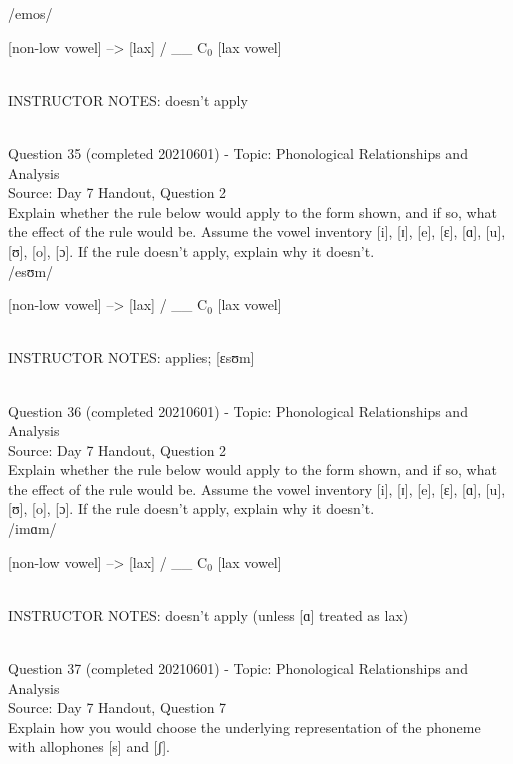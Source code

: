 \documentclass[12pt]{article}
\begin{document}
/emos/

{[non-low vowel]} --> {[lax]} / __ C$_0$ {[lax vowel]}


~\\
INSTRUCTOR NOTES: doesn't apply


~\\

{\large Question 35} (completed 20210601) - Topic: Phonological Relationships and Analysis\\
Source: Day 7 Handout, Question 2\\

Explain whether the rule below would apply to the form shown, and if so, what the effect of the rule would be. Assume the vowel inventory [i], [ɪ], [e], [ɛ], [ɑ], [u], [ʊ], [o], [ɔ]. If the rule doesn't apply, explain why it doesn't.\\

/esʊm/

{[non-low vowel]} --> {[lax]} / __ C$_0$ {[lax vowel]}


~\\
INSTRUCTOR NOTES: applies; [ɛsʊm]


~\\

{\large Question 36} (completed 20210601) - Topic: Phonological Relationships and Analysis\\
Source: Day 7 Handout, Question 2\\

Explain whether the rule below would apply to the form shown, and if so, what the effect of the rule would be. Assume the vowel inventory [i], [ɪ], [e], [ɛ], [ɑ], [u], [ʊ], [o], [ɔ]. If the rule doesn't apply, explain why it doesn't.\\

/imɑm/

{[non-low vowel]} --> {[lax]} / __ C$_0$ {[lax vowel]}


~\\
INSTRUCTOR NOTES: doesn't apply (unless [ɑ] treated as lax)


~\\

{\large Question 37} (completed 20210601) - Topic: Phonological Relationships and Analysis\\
Source: Day 7 Handout, Question 7\\

Explain how you would choose the underlying representation of the phoneme with allophones [s] and [ʃ].\\
\end{document}
